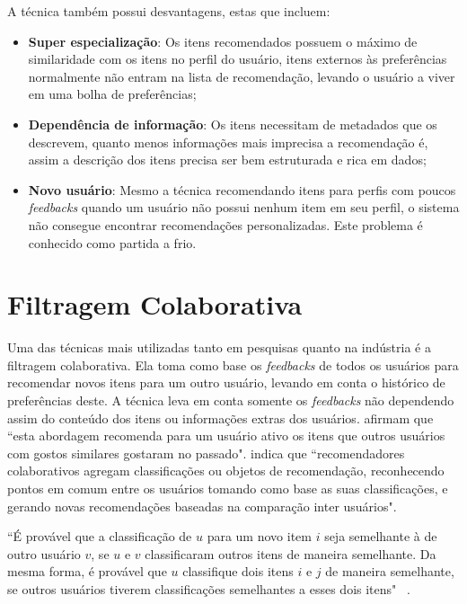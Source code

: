 A técnica também possui desvantagens, estas que incluem:
\begin{itemize}
    \item \textbf{Super especialização}: Os itens recomendados possuem o máximo de similaridade com os itens no perfil do usuário, itens externos às preferências normalmente não entram na lista de recomendação, levando o usuário a viver em uma bolha de preferências;
    
    \item \textbf{Dependência de informação}: Os itens necessitam de metadados que os descrevem, quanto menos informações mais imprecisa a recomendação é, assim a descrição dos itens precisa ser bem estruturada e rica em dados;
    
    \item \textbf{Novo usuário}: Mesmo a técnica recomendando itens para perfis com poucos \textit{feedbacks} quando um usuário não possui nenhum item em seu perfil, o sistema não consegue encontrar recomendações personalizadas. Este problema é conhecido como partida a frio.
\end{itemize}

\section{Filtragem Colaborativa}
\label{sec:collaborative_filtering}
Uma das técnicas mais utilizadas tanto em pesquisas quanto na indústria é a filtragem colaborativa. Ela toma como base os \textit{feedbacks} de todos os usuários para recomendar novos itens para um outro usuário, levando em conta o histórico de preferências deste. A técnica leva em conta somente os \textit{feedbacks} não dependendo assim do conteúdo dos itens ou informações extras dos usuários.  afirmam que ``esta abordagem recomenda para um usuário ativo os itens que outros usuários com gostos similares gostaram no passado".  indica que ``recomendadores colaborativos agregam classificações ou objetos de recomendação, reconhecendo pontos em comum entre os usuários tomando como base as suas classificações, e gerando novas recomendações baseadas na comparação inter usuários".

``É provável que a classificação de $u$ para um novo item $i$ seja semelhante à de outro usuário $v$, se $u$ e $v$ classificaram outros itens de maneira semelhante. Da mesma forma, é provável que $u$ classifique dois itens $i$ e $j$ de maneira semelhante, se outros usuários tiverem classificações semelhantes a esses dois itens"~ \cite{Desrosiers:2011}.


